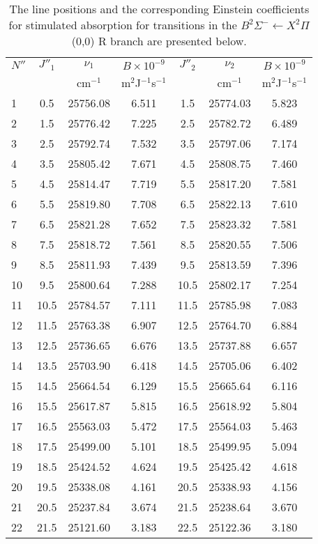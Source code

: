 \begin{table}
  \caption[Absorption lines and coefficients for the \(B^2\Sigma^-\leftarrow X^2\Pi\) (0,0) R branch]{The line positions and the corresponding Einstein coefficients for stimulated absorption for transitions in the \(B^2\Sigma^-\leftarrow X^2\Pi\) (0,0) R branch are presented below.}
  \begin{center}
    \begin{tabular}{lcccccc}
      \(N''\) & \(J''_1\) & \(\nu_1\) & \(B\times10^{-9}\) & \(J''_2\) & \(\nu_2\) & \(B\times10^{-9}\) \tabularnewline
        & & cm\(^{-1}\) & m\(^2\)J\(^{-1}\)s\(^{-1}\) & & cm\(^{-1}\) & m\(^2\)J\(^{-1}\)s\(^{-1}\) \tabularnewline
      \hline\hline
      1  & 0.5  & 25756.08 & 6.511 & 1.5  & 25774.03 & 5.823 \tabularnewline
      2  & 1.5  & 25776.42 & 7.225 & 2.5  & 25782.72 & 6.489 \tabularnewline
      3  & 2.5  & 25792.74 & 7.532 & 3.5  & 25797.06 & 7.174 \tabularnewline
      4  & 3.5  & 25805.42 & 7.671 & 4.5  & 25808.75 & 7.460 \tabularnewline
      5  & 4.5  & 25814.47 & 7.719 & 5.5  & 25817.20 & 7.581 \tabularnewline
      6  & 5.5  & 25819.80 & 7.708 & 6.5  & 25822.13 & 7.610 \tabularnewline
      7  & 6.5  & 25821.28 & 7.652 & 7.5  & 25823.32 & 7.581 \tabularnewline
      8  & 7.5  & 25818.72 & 7.561 & 8.5  & 25820.55 & 7.506 \tabularnewline
      9  & 8.5  & 25811.93 & 7.439 & 9.5  & 25813.59 & 7.396 \tabularnewline
      10 & 9.5  & 25800.64 & 7.288 & 10.5 & 25802.17 & 7.254 \tabularnewline
      11 & 10.5 & 25784.57 & 7.111 & 11.5 & 25785.98 & 7.083 \tabularnewline
      12 & 11.5 & 25763.38 & 6.907 & 12.5 & 25764.70 & 6.884 \tabularnewline
      13 & 12.5 & 25736.65 & 6.676 & 13.5 & 25737.88 & 6.657 \tabularnewline
      14 & 13.5 & 25703.90 & 6.418 & 14.5 & 25705.06 & 6.402 \tabularnewline
      15 & 14.5 & 25664.54 & 6.129 & 15.5 & 25665.64 & 6.116 \tabularnewline
      16 & 15.5 & 25617.87 & 5.815 & 16.5 & 25618.92 & 5.804 \tabularnewline
      17 & 16.5 & 25563.03 & 5.472 & 17.5 & 25564.03 & 5.463 \tabularnewline
      18 & 17.5 & 25499.00 & 5.101 & 18.5 & 25499.95 & 5.094 \tabularnewline
      19 & 18.5 & 25424.52 & 4.624 & 19.5 & 25425.42 & 4.618 \tabularnewline
      20 & 19.5 & 25338.08 & 4.161 & 20.5 & 25338.93 & 4.156 \tabularnewline
      21 & 20.5 & 25237.84 & 3.674 & 21.5 & 25238.64 & 3.670 \tabularnewline
      22 & 21.5 & 25121.60 & 3.183 & 22.5 & 25122.36 & 3.180 \tabularnewline
      \hline
    \end{tabular}
  \end{center}
  \label{tab:absorptionLines}
\end{table}

